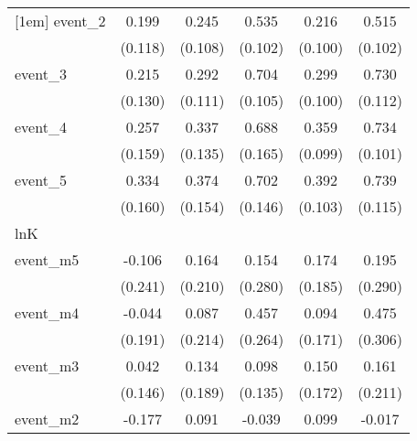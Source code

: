 {\begin{tabular}{l*{5}{c}}
[1em]
event\_2     &       0.199         &       0.245\sym{*}  &       0.535\sym{***}&       0.216\sym{*}  &       0.515\sym{***}\\
            &     (0.118)         &     (0.108)         &     (0.102)         &     (0.100)         &     (0.102)         \\
[1em]
event\_3     &       0.215         &       0.292\sym{**} &       0.704\sym{***}&       0.299\sym{**} &       0.730\sym{***}\\
            &     (0.130)         &     (0.111)         &     (0.105)         &     (0.100)         &     (0.112)         \\
[1em]
event\_4     &       0.257         &       0.337\sym{*}  &       0.688\sym{***}&       0.359\sym{***}&       0.734\sym{***}\\
            &     (0.159)         &     (0.135)         &     (0.165)         &     (0.099)         &     (0.101)         \\
[1em]
event\_5     &       0.334\sym{*}  &       0.374\sym{*}  &       0.702\sym{***}&       0.392\sym{***}&       0.739\sym{***}\\
            &     (0.160)         &     (0.154)         &     (0.146)         &     (0.103)         &     (0.115)         \\
\hline
lnK         &                     &                     &                     &                     &                     \\
event\_m5    &      -0.106         &       0.164         &       0.154         &       0.174         &       0.195         \\
            &     (0.241)         &     (0.210)         &     (0.280)         &     (0.185)         &     (0.290)         \\
[1em]
event\_m4    &      -0.044         &       0.087         &       0.457         &       0.094         &       0.475         \\
            &     (0.191)         &     (0.214)         &     (0.264)         &     (0.171)         &     (0.306)         \\
[1em]
event\_m3    &       0.042         &       0.134         &       0.098         &       0.150         &       0.161         \\
            &     (0.146)         &     (0.189)         &     (0.135)         &     (0.172)         &     (0.211)         \\
[1em]
event\_m2    &      -0.177         &       0.091         &      -0.039         &       0.099         &      -0.017         \\

\end{tabular}}
